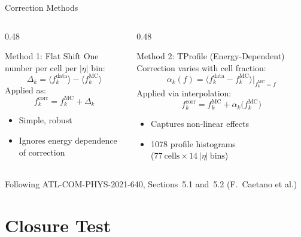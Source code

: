 \documentclass[aspectratio=169,10pt]{beamer}
\begin{document}
\begin{frame}{Correction Methods}
\begin{columns}[T]
\begin{column}{0.48\textwidth}
  \begin{block}{Method 1: Flat Shift}
    One number per cell per $|\eta|$ bin:
    \[
      \Delta_k = \langle f_k^\text{data}\rangle
              - \langle f_k^\text{MC}\rangle
    \]
    Applied as:
    \[
      f_k^\text{corr} = f_k^\text{MC} + \Delta_k
    \]
    \vspace{2pt}
    \begin{itemize}
      \item Simple, robust
      \item Ignores energy dependence of correction
    \end{itemize}
  \end{block}
\end{column}
\begin{column}{0.48\textwidth}
  \begin{block}{Method 2: TProfile (Energy-Dependent)}
    Correction varies with cell fraction:
    \[
      \alpha_k(f) = \bigl\langle f_k^\text{data}
        - f_k^\text{MC}\bigr\rangle\Big|_{f_k^\text{MC}=f}
    \]
    Applied via interpolation:
    \[
      f_k^\text{corr} = f_k^\text{MC}
        + \alpha_k\!\bigl(f_k^\text{MC}\bigr)
    \]
    \vspace{2pt}
    \begin{itemize}
      \item Captures non-linear effects
      \item 1078 profile histograms\\
            {\small ($77~\text{cells}\times 14~|\eta|~\text{bins}$)}
    \end{itemize}
  \end{block}
\end{column}
\end{columns}
\vspace{8pt}
\centering
{\small Following ATL-COM-PHYS-2021-640, Sections~5.1 and~5.2
(F.~Caetano et al.)}
\end{frame}

\section{Closure Test}
\end{document}
